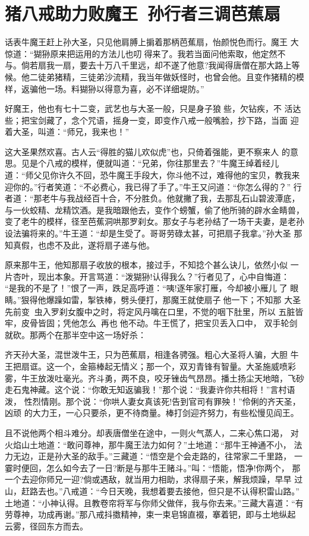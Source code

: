 \chapter{猪八戒助力败魔王~孙行者三调芭蕉扇}

话表牛魔王赶上孙大圣，只见他肩膊上掮着那柄芭蕉扇，怡颜悦色而行。魔王
大惊道：“猢狲原来把运用的方法儿也叨得来了。我若当面问他索取，他定然不
与。倘若扇我一扇，要去十万八千里远，却不遂了他意?我闻得唐僧在那大路上等
候。他二徒弟猪精，三徒弟沙流精，我当年做妖怪时，也曾会他。且变作猪精的模
样，返骗他一场。料猢狲以得意为喜，必不详细堤防。”

好魔王，他也有七十二变，武艺也与大圣一般，只是身子狼些，欠钻疾，不
活达些；把宝剑藏了，念个咒语，摇身一变，即变作八戒一般嘴脸，抄下路，当面
迎着大圣，叫道：“师兄，我来也！”

这大圣果然欢喜。古人云“得胜的猫儿欢似虎”也，只倚着强能，更不察来人
的意思。见是个八戒的模样，便就叫道：“兄弟，你往那里去？”牛魔王绰着经儿
道：“师父见你许久不回，恐牛魔王手段大，你斗他不过，难得他的宝贝，教我来
迎你的。”行者笑道：“不必费心，我已得了手了。”牛王又问道：“你怎么得的？”
行者道：“那老牛与我战经百十合，不分胜负。他就撇了我，去那乱石山碧波潭底，
与一伙蛟精、龙精饮酒。是我暗跟他去，变作个螃蟹，偷了他所骑的辟水金睛兽，
变了老牛的模样，径至芭蕉洞哄那罗刹女。那女子与老孙结了一场干夫妻，是老孙
设法骗将来的。”牛王道：“却是生受了。哥哥劳碌太甚，可把扇子我拿。”孙大圣
那知真假，也虑不及此，遂将扇子递与他。

原来那牛王，他知那扇子收放的根本，接过手，不知捻个甚么诀儿，依然小似
一片杏叶，现出本象。开言骂道：“泼猢狲!认得我么？”行者见了，心中自悔道：
“是我的不是了！”恨了一声，跌足高呼道：“咦!逐年家打雁，今却被小雁儿了
眼睛。”狠得他爆躁如雷，掣铁棒，劈头便打，那魔王就使扇子他一下；不知那
大圣先前变虫入罗刹女腹中之时，将定风丹噙在口里，不觉的咽下肚里，所以
五脏皆牢，皮骨皆固；凭他怎么，再也他不动。牛王慌了，把宝贝丢入口中，
双手轮剑就砍。那两个在那半空中这一场好杀：

齐天孙大圣，混世泼牛王，只为芭蕉扇，相逢各骋强。粗心大圣将人骗，大胆
牛王把扇诓。这一个，金箍棒起无情义；那一个，双刃青锋有智量。大圣施威喷彩
雾，牛王放泼吐毫光。齐斗勇，两不良，咬牙锉齿气昂昂。播土扬尘天地暗，飞砂
走石鬼神藏。这个说：“你敢无知返骗我！”那个说：“我妻许你共相将！”言村语泼，
性烈情刚。那个说：“你哄人妻女真该死!告到官司有罪殃！”伶俐的齐天圣，凶顽
的大力王，一心只要杀，更不待商量。棒打剑迎齐努力，有些松慢见阎王。

且不说他两个相斗难分。却表唐僧坐在途中，一则火气蒸人，二来心焦口渴，
对火焰山土地道：“敢问尊神，那牛魔王法力如何？”土地道：“那牛王神通不小，
法力无边，正是孙大圣的敌手。”三藏道：“悟空是个会走路的，往常家二千里路，
一霎时便回，怎么如今去了一日?断是与那牛王赌斗。”叫：“悟能，悟净!你两个，
那一个去迎你师兄一迎?倘或遇敌，就当用力相助，求得扇子来，解我烦躁，早早
过山，赶路去也。”八戒道：“今日天晚，我想着要去接他，但只是不认得积雷山路。”
土地道：“小神认得。且教卷帘将军与你师父做伴，我与你去来。”三藏大喜道：“有
劳尊神，功成再谢。”那八戒抖擞精神，束一束皂锦直裰，搴着钯，即与土地纵起
云雾，径回东方而去。

